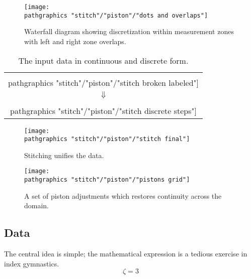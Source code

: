\begin{figure}[htbp] %
   \centering
   \texttt{[image: \\pathgraphics "stitch"/"piston"/"dots and overlaps"]} 
   \caption{Waterfall diagram showing discretization within measurement zones with left and right zone overlaps.}
   \label{fig:dots and overlaps}
\end{figure}

  \begin{table}[htbp]  %
    \caption{The input data in continuous and discrete form.}
    \begin{center}
      \begin{tabular}{c}
        \texttt{[image: \\pathgraphics "stitch"/"piston"/"stitch broken labeled"]} \\
        \huge{$\Downarrow$} \\
        \texttt{[image: \\pathgraphics "stitch"/"piston"/"stitch discrete steps"]}
      \end{tabular}
    \end{center}
  \end{table}%

\begin{figure}[htbp] %
   \centering
   \texttt{[image: \\pathgraphics "stitch"/"piston"/"stitch final"]} 
   \caption{Stitching unifies the data.}
   \label{fig:stitch final}
\end{figure}

\begin{figure}[htbp] %
   \centering
   \texttt{[image: \\pathgraphics "stitch"/"piston"/"pistons grid"]} 
   \caption{A set of piston adjustments which restores continuity across the domain.}
   \label{fig:pistons}
\end{figure}

  \subsection{Data}  %
The central idea is simple; the mathematical expression is a tedious exercise in index gymnastics.
  \begin{equation*}   %
    \zeta = 3
  \end{equation*}

